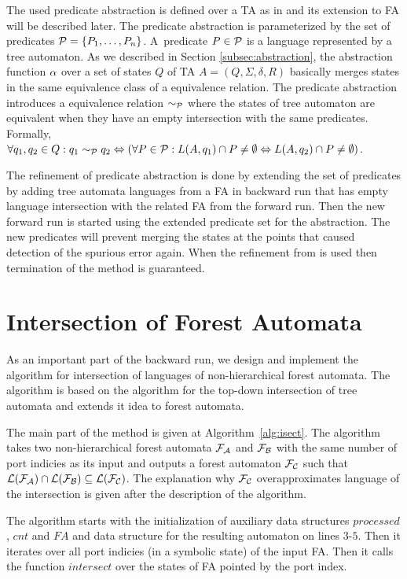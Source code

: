 The used predicate abstraction is defined over a TA as in \cite{artmc}
and its extension to FA will be described later.
The predicate abstraction is parameterized by the set of predicates $\mathcal{P}=\{P_1, \ldots, P_n\}$.
A~predicate $P \in \mathcal{P}$ is a language represented by
a tree automaton.
As we described in Section \ref{subsec:abstraction}, the abstraction function $\alpha$
over a set of states $Q$ of TA $A=(Q,\Sigma,\delta, R)$ basically
merges states in the same equivalence class of a equivalence relation.
The predicate abstraction introduces a equivalence relation $\sim_{\mathcal{P}}$
where the states of tree automaton are equivalent when
they have an empty intersection with the same predicates.
Formally, $\forall q_1,q_2 \in Q: q_1 \sim_{\mathcal{P}} q_2 \Leftrightarrow
(\forall P \in \mathcal{P}: L(A,q_1) \cap P \neq \emptyset
\Leftrightarrow L(A,q_2) \cap P \neq \emptyset)$.

The refinement of predicate abstraction is done by extending the
set of predicates by adding tree automata languages from
a FA in backward run that has empty language
intersection with the related FA from the forward run.
Then the new forward run is started using the extended predicate
set for the abstraction.
The new predicates will prevent merging the states at the points
that caused detection of the spurious error again.
When the refinement from \cite{artmc} is used
then termination of the method is guaranteed.

\section{Intersection of Forest Automata}
\label{sec:isect}
As an important part of the backward run,
we design and implement the algorithm for intersection
of languages of non-hierarchical forest automata.
The algorithm is based on the algorithm for the top-down
intersection of tree automata and extends it idea to forest automata.

The main part of the method is given at Algorithm~\ref{alg:isect}.
The algorithm takes two non-hierarchical forest automata $\mathcal{F}_{\mathcal{A}}$
and $\mathcal{F}_{\mathcal{B}}$ with the same number of port indicies
as its input and outputs a forest automaton $\mathcal{F}_{\mathcal{C}}$ such that
$\mathcal{L}(\mathcal{F}_{\mathcal{A}}) \cap \mathcal{L}(\mathcal{F}_{\mathcal{B}}) \subseteq \mathcal{L}(\mathcal{F}_{\mathcal{C}})$.
The explanation why $\mathcal{F}_{\mathcal{C}}$ overapproximates language
of the intersection is given after the description of the algorithm.

The algorithm starts with the initialization of auxiliary data structures $\mathit{processed}$,
$\mathit{cnt}$ and $\mathit{FA}$ and data structure for the resulting automaton on lines $3$-$5$.
Then it iterates over all port indicies (in a symbolic state) of the input FA.
Then it calls the function $\mathit{intersect}$ over the states of FA pointed
by the port index.

